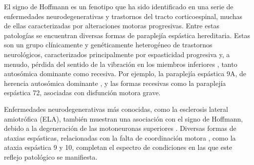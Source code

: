 El signo de Hoffmann es un fenotipo que ha sido identificado en una serie de enfermedades neurodegenerativas y trastornos del tracto corticoespinal, muchas de ellas caracterizadas por alteraciones motoras progresivas. Entre estas patologías se encuentran diversas formas de paraplejía espástica hereditaria. Estas son un grupo clínicamente y genéticamente heterogéneo de trastornos neurológicos, caracterizados principalmente por espasticidad progresiva y, a menudo, pérdida del sentido de la vibración en los miembros inferiores \cite{Esteves2014}, tanto autosómica dominante como recesiva. Por ejemplo, la paraplejía espástica 9A, de herencia autosómica dominante \cite{10.1093/brain/awv143}, y las formas recesivas como la paraplejía espástica 72, asociadas con disfunción motora grave.

Enfermedades neurodegenerativas más conocidas, como la esclerosis lateral amiotrófica (ELA), también muestran una asociación con el signo de Hoffmann, debido a la degeneración de las motoneuronas superiores \cite{RIANCHO201927}. Diversas formas de ataxias espásticas, relacionadas con la falta de coordinación motora \cite{Pedroso2022}, como la ataxia espástica 9 y 10, completan el espectro de condiciones en las que este reflejo patológico se manifiesta.

